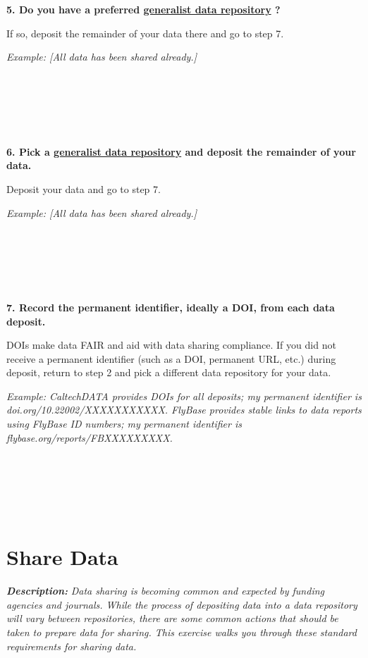 \documentclass[
]{book}
\begin{document}
~

~

\textbf{5. Do you have a preferred \href{https://sharing.nih.gov/data-management-and-sharing-policy/sharing-scientific-data/generalist-repositories}{generalist data repository} \citep{nih_generalist_2023}?}

If so, deposit the remainder of your data there and go to step 7.

\emph{Example: {[}All data has been shared already.{]}}

~

~

~

\textbf{6. Pick a \href{https://sharing.nih.gov/data-management-and-sharing-policy/sharing-scientific-data/generalist-repositories}{generalist data repository} \citep{nih_generalist_2023} and deposit the remainder of your data.}

Deposit your data and go to step 7.

\emph{Example: {[}All data has been shared already.{]}}

~

~

~

\textbf{7. Record the permanent identifier, ideally a DOI, from each data deposit.}

DOIs make data FAIR \citep{wilkinson_fair_2016} and aid with data sharing compliance. If you did not receive a permanent identifier (such as a DOI, permanent URL, etc.) during deposit, return to step 2 and pick a different data repository for your data.

\emph{Example: CaltechDATA provides DOIs for all deposits; my permanent identifier is doi.org/10.22002/XXXXXXXXXXX. FlyBase provides stable links to data reports using FlyBase ID numbers; my permanent identifier is flybase.org/reports/FBXXXXXXXXX.}

~

~

~

\hypertarget{share-data}{%
\section{Share Data}\label{share-data}}

\textbf{\emph{Description:}} \emph{Data sharing is becoming common and expected by funding agencies and journals. While the process of depositing data into a data repository will vary between repositories, there are some common actions that should be taken to prepare data for sharing. This exercise walks you through these standard requirements for sharing data.}
\end{document}
